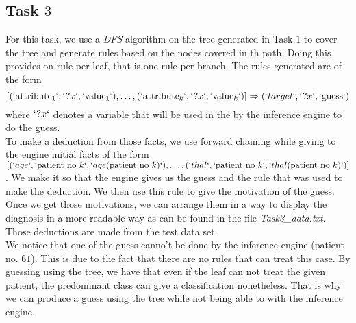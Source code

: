 \documentclass[french]{article}
\begin{document}
\subsection{Task $3$}
	For this task, we use a \emph{DFS} algorithm on the tree generated in Task $1$ to cover the tree and generate rules based on the nodes covered in th path. Doing this provides on rule per leaf, that is one rule per branch. The rules generated are of the form $$ [(`\mathrm{attribute}_1`,` ?x`, `\mathrm{value}_1`),\ldots,(`\mathrm{attribute}_k`,` ?x`, `\mathrm{value}_k`)]\Rightarrow(`target`, `?x` , `\mathrm{guess}`)$$ where $`?x`$ denotes a variable that will be used in the by the inference engine to do the guess.\\
	To make a deduction from those facts, we use forward chaining while giving to the engine initial facts of the form $[(`age`, `\mathrm{patient\ no}\ k`, `age(\mathrm{patient\ no}\ k)`),\ldots,(`thal`, `\mathrm{patient\ no}\ k`, `thal(\mathrm{patient\ no}\ k)`)]$. We make it so that the engine gives us the guess and the rule that was used to make the deduction. We then use this rule to give the motivation of the guess. Once we get those motivations, we can arrange them in a way to display the diagnosis in a more readable way as can be found in the file \emph{Task3\_data.txt}. Those deductions are made from the test data set.\\
	We notice that one of the guess canno't be done by the inference engine (patient no. $61$). This is due to the fact that there are no rules that can treat this case. By guessing using the tree, we have that even if the leaf can not treat the given patient, the predominant class can give a classification nonetheless. That is why we can produce a guess using the tree while not being able to with the inference engine.
	
\end{document}
